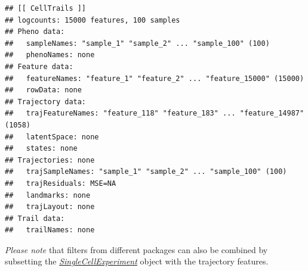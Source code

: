 \documentclass[]{book}
\newenvironment{Shaded}{\begin{snugshade}}{\end{snugshade}}
\newcommand{\KeywordTok}[1]{\textcolor[rgb]{0.13,0.29,0.53}{\textbf{#1}}}
\newcommand{\DataTypeTok}[1]{\textcolor[rgb]{0.13,0.29,0.53}{#1}}
\newcommand{\FloatTok}[1]{\textcolor[rgb]{0.00,0.00,0.81}{#1}}
\newcommand{\StringTok}[1]{\textcolor[rgb]{0.31,0.60,0.02}{#1}}
\newcommand{\CommentTok}[1]{\textcolor[rgb]{0.56,0.35,0.01}{\textit{#1}}}
\newcommand{\OtherTok}[1]{\textcolor[rgb]{0.56,0.35,0.01}{#1}}
\newcommand{\OperatorTok}[1]{\textcolor[rgb]{0.81,0.36,0.00}{\textbf{#1}}}
\newcommand{\NormalTok}[1]{#1}
\theoremstyle{definition}
\theoremstyle{definition}
\theoremstyle{definition}
\theoremstyle{remark}
\begin{document}
\begin{Shaded}
\end{Shaded}

\begin{verbatim}
## [[ CellTrails ]] 
## logcounts: 15000 features, 100 samples
## Pheno data: 
##   sampleNames: "sample_1" "sample_2" ... "sample_100" (100)
##   phenoNames: none
## Feature data: 
##   featureNames: "feature_1" "feature_2" ... "feature_15000" (15000)
##   rowData: none
## Trajectory data: 
##   trajFeatureNames: "feature_118" "feature_183" ... "feature_14987" (1058)
##   latentSpace: none
##   states: none
## Trajectories: none
##   trajSampleNames: "sample_1" "sample_2" ... "sample_100" (100)
##   trajResiduals: MSE=NA
##   landmarks: none
##   trajLayout: none
## Trail data: 
##   trailNames: none
\end{verbatim}

\emph{Please note} that filters from different packages can also be
combined by subsetting the
\emph{\href{http://bioconductor.org/packages/SingleCellExperiment}{SingleCellExperiment}}
object with the trajectory features.
\end{document}

